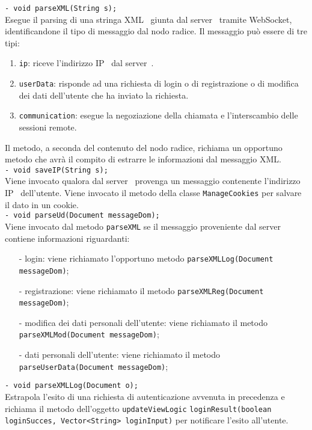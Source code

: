 {{\begin{sloppypar}
{{\begin{itemize}
{					\texttt{- void parseXML(String s);}\\
					Esegue il parsing di una stringa XML\g~ giunta dal server\g~ tramite WebSocket, identificandone il tipo di messaggio dal nodo radice. Il messaggio può essere di tre tipi:
					\begin{enumerate}
						\item \texttt{ip}: riceve l'indirizzo IP\g~ dal server\g\g~.
						\item \texttt{userData}: risponde ad una richiesta di login o di registrazione o di modifica dei dati dell'utente che ha inviato la richiesta.
						\item \texttt{communication}: esegue la negoziazione della chiamata e l'interscambio delle sessioni remote.
					\end{enumerate}
					Il metodo, a seconda del contenuto del nodo radice, richiama un opportuno metodo che avrà il compito di estrarre le informazioni dal messaggio XML\g.\\

					\texttt{- void saveIP(String s);}\\	
					Viene invocato qualora dal server\g~ provenga un messaggio contenente l'indirizzo IP\g~ dell'utente. Viene invocato il metodo della classe \texttt{ManageCookies} per salvare il dato in un cookie\g.\\

					\texttt{- void parseUd(Document messageDom);}\\
					Viene invocato dal metodo \texttt{parseXML} se il messaggio proveniente dal server\g~ contiene informazioni riguardanti:
					\begin{itemize}
						\item[-] login: viene richiamato l'opportuno metodo \texttt{parseXMLLog(Document messageDom)};
						\item[-] registrazione: viene richiamato il metodo \texttt{parseXMLReg(Document messageDom)};
						\item[-] modifica dei dati personali dell'utente: viene richiamato il metodo \texttt{parseXMLMod(Document messageDom)};
						\item[-] dati personali dell'utente: viene richiamato il metodo \texttt{parseUserData(Document messageDom)};\\
					\end{itemize}

					\texttt{- void parseXMLLog(Document o);}\\
					Estrapola l'esito di una richiesta di autenticazione avvenuta in precedenza e richiama il metodo dell'oggetto \texttt{updateViewLogic} \texttt{loginResult(boolean loginSucces, Vector<String> loginInput)} per notificare l'esito all'utente.\\

}
\end{itemize}}}
\end{sloppypar}}}
